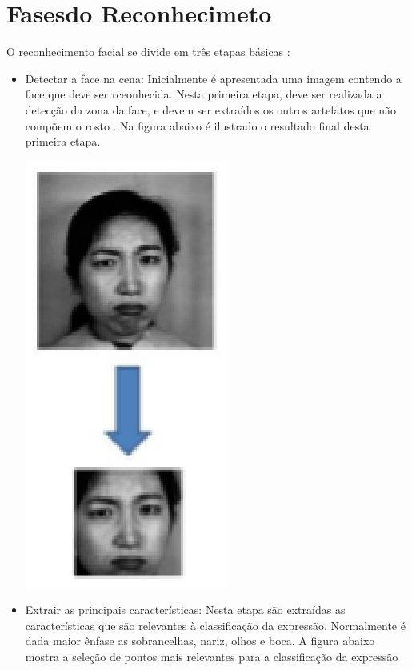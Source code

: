 \section{Fasesdo Reconhecimeto}
O reconhecimento facial se divide em três etapas básicas \cite{Elizabeth}:
\begin{itemize}
\item Detectar a face na cena: Inicialmente é apresentada uma imagem contendo a face que deve ser rceonhecida. Nesta primeira etapa, deve ser realizada a detecção da zona da face, e devem ser extraídos os outros artefatos que não compõem o rosto \cite{FernandoGil}.
Na figura abaixo é ilustrado o resultado final desta primeira etapa.
\begin{center}
	\includegraphics[scale=1.00]{graficos/rosto}
	\cite{Elizabeth}
\end{center}
\item Extrair as principais características: Nesta etapa são extraídas as características que são relevantes à classificação da expressão. Normalmente é dada maior ênfase as sobrancelhas, nariz, olhos e boca.
A figura abaixo mostra a seleção de pontos mais relevantes para a classificação da expressão
\begin{center}

\end{center}
\end{itemize}
